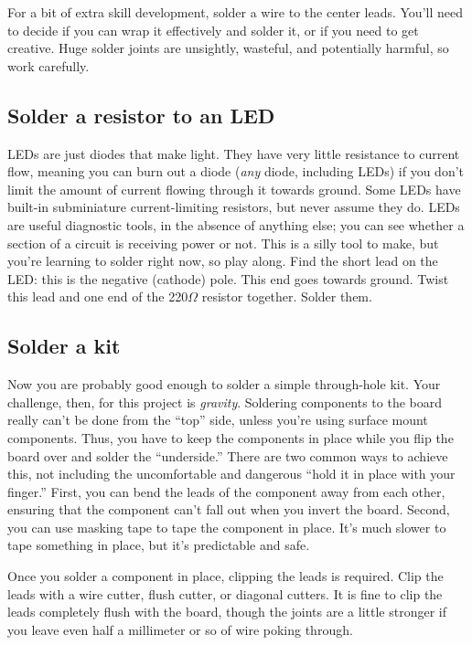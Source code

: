 \documentclass[12pt]{article}
\newcommand{\+}{\item}
\begin{document}
For a bit of extra skill development, solder a wire to the center leads. You'll need to decide if you can wrap it effectively and solder it, or if you need to get creative. Huge solder joints are unsightly, wasteful, and potentially harmful, so work carefully.

\subsection{Solder a resistor to an LED}

LEDs are just diodes that make light. They have very little resistance to current flow, meaning you can burn out a diode (\emph{any} diode, including LEDs) if you don't limit the amount of current flowing through it towards ground. Some LEDs have built-in subminiature current-limiting resistors, but never assume they do. LEDs are useful diagnostic tools, in the absence of anything else; you can see whether a section of a circuit is receiving power or not. This is a silly tool to make, but you're learning to solder right now, so play along. Find the short lead on the LED: this is the negative (cathode) pole. This end goes towards ground. Twist this lead and one end of the 220$\Omega$ resistor together. Solder them. 

\subsection{Solder a kit}

Now you are probably good enough to solder a simple through-hole kit. Your challenge, then, for this project is \emph{gravity}. Soldering components to the board really can't be done from the ``top'' side, unless you're using surface mount components. Thus, you have to keep the components in place while you flip the board over and solder the ``underside.'' There are two common ways to achieve this, not including the uncomfortable and dangerous ``hold it in place with your finger.'' First, you can bend the leads of the component away from each other, ensuring that the component can't fall out when you invert the board. Second, you can use masking tape to tape the component in place. It's much slower to tape something in place, but it's predictable and safe.

Once you solder a component in place, clipping the leads is required. Clip the leads with a wire cutter, flush cutter, or diagonal cutters. It is fine to clip the leads completely flush with the board, though the joints are a little stronger if you leave even half a millimeter or so of wire poking through. 
\end{document}
